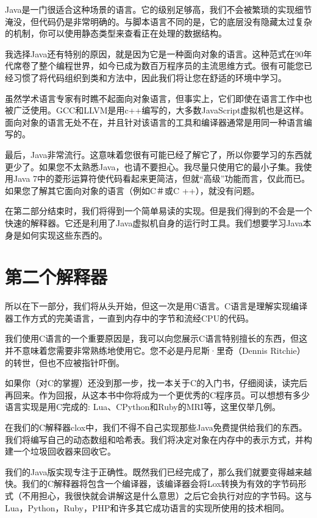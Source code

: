 \documentclass[cn,11pt,chinese]{elegantbook}
\begin{document}
Java是一门很适合这种场景的语言。它的级别足够高，我们不会被繁琐的实现细节淹没，但代码仍是非常明确的。与脚本语言不同的是，它的底层没有隐藏太过复杂的机制，你可以使用静态类型来查看正在处理的数据结构。

我选择Java还有特别的原因，就是因为它是一种面向对象的语言。这种范式在90年代席卷了整个编程世界，如今已成为数百万程序员的主流思维方式。很有可能您已经习惯了将代码组织到类和方法中，因此我们将让您在舒适的环境中学习。

虽然学术语言专家有时瞧不起面向对象语言，但事实上，它们即使在语言工作中也被广泛使用。GCC和LLVM是用c++编写的，大多数JavaScript虚拟机也是这样。面向对象的语言无处不在，并且针对该语言的工具和编译器通常是用同一种语言编写的。

最后，Java非常流行。这意味着您很有可能已经了解它了，所以你要学习的东西就更少了。如果您不太熟悉Java，也请不要担心。我尽量只使用它的最小子集。我使用Java 7中的菱形运算符使代码看起来更简洁，但就“高级”功能而言，仅此而已。如果您了解其它面向对象的语言（例如C＃或C ++），就没有问题。

在第二部分结束时，我们将得到一个简单易读的实现。但是我们得到的不会是一个快速的解释器。它还是利用了Java虚拟机自身的运行时工具。我们想要学习Java本身是如何实现这些东西的。

\section{第二个解释器}

所以在下一部分，我们将从头开始，但这一次是用C语言。C语言是理解实现编译器工作方式的完美语言，一直到内存中的字节和流经CPU的代码。

我们使用C语言的一个重要原因是，我可以向您展示C语言特别擅长的东西，但这并不意味着您需要非常熟练地使用它。您不必是丹尼斯·里奇（Dennis Ritchie）的转世，但也不应被指针吓倒。

如果你（对C的掌握）还没到那一步，找一本关于C的入门书，仔细阅读，读完后再回来。作为回报，从这本书中你将成为一个更优秀的C程序员。可以想想有多少语言实现是用C完成的: Lua、CPython和Ruby的MRI等，这里仅举几例。

在我们的C解释器clox中，我们不得不自己实现那些Java免费提供给我们的东西。 我们将编写自己的动态数组和哈希表。我们将决定对象在内存中的表示方式，并构建一个垃圾回收器来回收它。

我们的Java版实现专注于正确性。既然我们已经完成了，那么我们就要变得越来越快。我们的C解释器将包含一个编译器，该编译器会将Lox转换为有效的字节码形式（不用担心，我很快就会讲解这是什么意思）之后它会执行对应的字节码。这与Lua，Python，Ruby，PHP和许多其它成功语言的实现所使用的技术相同。
\end{document}
